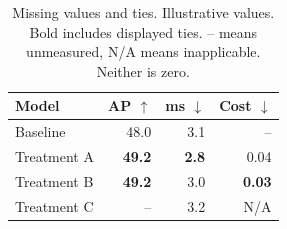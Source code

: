 \begin{table}[!htbp]
\centering\small
\begin{tabular}{lrrr}
\toprule
Model & AP $\uparrow$ & ms $\downarrow$ & Cost $\downarrow$ \\
\midrule
Baseline & 48.0 & 3.1 & -- \\
Treatment A & \textbf{49.2} & \textbf{2.8} & 0.04 \\
Treatment B & \textbf{49.2} & 3.0 & \textbf{0.03} \\
Treatment C & -- & 3.2 & N/A \\
\bottomrule
\end{tabular}
\caption{Missing values and ties. Illustrative values. Bold includes displayed ties. -- means unmeasured, N/A means inapplicable. Neither is zero.}
\label{tab:missing-and-ties}
\end{table}
